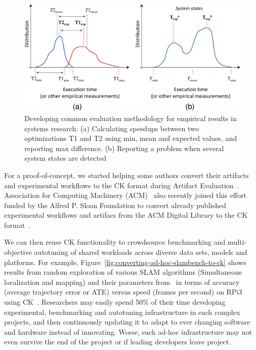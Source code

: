    \begin{figure}[!htbp]
     \centering
      \includegraphics[width=5in]
      {ck-assets/994e7359d7760ab1-cropped.pdf} %
     \caption{
       Developing common evaluation methodology for empirical results in systems research:
       (a) Calculating speedups between two optimizations T1 and T2 using min, mean and expected values, and reporting max difference.
       (b) Reporting a problem when several system states are detected
     }
     \label{fig:reproducibility}
   \end{figure}

For a proof-of-concept, we started helping some authors convert their 
artifacts and experimental workflows to the CK format during 
Artifact Evaluation~\cite{ck-shared-repos,Ainsworth:2017:SPI:3049832.3049865,ctuning-ae1}.
%
Association for Computing Machinery (ACM)~\cite{acm} 
also recently joined this effort funded by the Alfred P. Sloan Foundation 
to convert already published experimental workflows 
and artifacs from the ACM Digital Library 
to the CK format~\cite{Flick:2015:PCA:2807591.2807619}.

We can then reuse CK functionality to crowdsource benchmarking and multi-objective
autotuning of shared workloads across diverse data sets, models and platforms.
%
For example, Figure~\ref{fig:converting-ad-hoc-slambench-to-ck} shows 
results from random exploration of various SLAM algorithms (Simultaneous localization and mapping)
and their parameters from~\cite{slambench_paper} in terms of accuracy (average trajectory error or ATE)
versus speed (frames per second) on RPi3 using CK~\cite{ck-slambench-repo}. 
%
Researchers may easily spend 50\% of their time developing
experimental, benchmarking and autotuning infrastructure 
in such complex projects, and then continuously
updating it to adapt to ever changing software and hardware
instead of innovating.
%
Worse, such ad-hoc infrastructure may not even survive 
the end of the project or if leading developers leave project.

